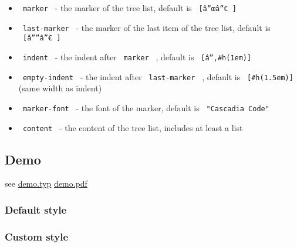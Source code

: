 \begin{itemize}
\tightlist
\item
  \texttt{\ marker\ } - the marker of the tree list, default is
  \texttt{\ {[}â”œâ”€\ {]}\ }
\item
  \texttt{\ last-marker\ } - the marker of the last item of the tree
  list, default is \texttt{\ {[}â””â”€\ {]}\ }
\item
  \texttt{\ indent\ } - the indent after \texttt{\ marker\ } , default
  is \texttt{\ {[}â”‚\#h(1em){]}\ }
\item
  \texttt{\ empty-indent\ } - the indent after \texttt{\ last-marker\ }
  , default is \texttt{\ {[}\#h(1.5em){]}\ } (same width as indent)
\item
  \texttt{\ marker-font\ } - the font of the marker, default is
  \texttt{\ "Cascadia\ Code"\ }
\item
  \texttt{\ content\ } - the content of the tree list, includes at least
  a list
\end{itemize}

\subsection{Demo}\label{demo}

see
\href{https://github.com/8LWXpg/typst-treet/blob/master/test/demo.typ}{demo.typ}
\href{https://github.com/8LWXpg/typst-treet/blob/master/test/demo.pdf}{demo.pdf}

\subsubsection{Default style}\label{default-style}

\begin{Shaded}
\begin{Highlighting}[]
\NormalTok{\#tree{-}list[}
\NormalTok{]}
\end{Highlighting}
\end{Shaded}


\subsubsection{Custom style}\label{custom-style}

